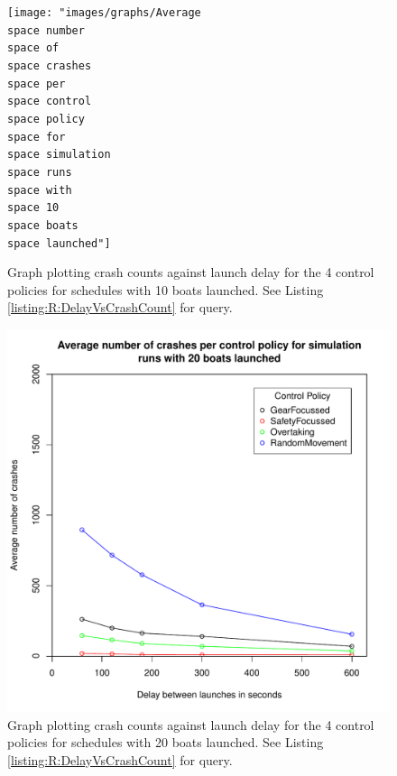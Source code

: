   \begin{figure}
  \begin{center}
    \texttt{[image: "images/graphs/Average\\space number\\space of\\space crashes\\space per\\space control\\space policy\\space for\\space simulation\\space runs\\space with\\space 10\\space boats\\space launched"]}
    \caption{Graph plotting crash counts against launch delay for the 4 control policies for schedules with 10 boats launched. See Listing \ref{listing:R:DelayVsCrashCount} for query.}
    \label{experiments:fig:crash_counts_10_launches}
  \end{center}
  \end{figure}
  
  \begin{figure}
  \begin{center}
    \includegraphics[scale=0.8]{"images/graphs/Average number of crashes per control policy for simulation runs with 20 boats launched"}
    \caption{Graph plotting crash counts against launch delay for the 4 control policies for schedules with 20 boats launched. See Listing \ref{listing:R:DelayVsCrashCount} for query.}
    \label{experiments:fig:crash_counts_20_launches}
  \end{center}
  \end{figure}
  
